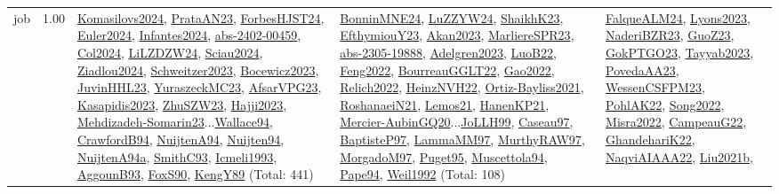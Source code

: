 {\begin{longtable}{p{3cm}r>{\raggedright\arraybackslash}p{6cm}>{\raggedright\arraybackslash}p{6cm}>{\raggedright\arraybackslash}p{8cm}}
\index{job}\index{Scheduling!job}job &  1.00 & \hyperref[detail:Komasilovs2024]{Komasilovs2024}, \hyperref[detail:PrataAN23]{PrataAN23}, \hyperref[detail:ForbesHJST24]{ForbesHJST24}, \hyperref[detail:Euler2024]{Euler2024}, \hyperref[detail:Infantes2024]{Infantes2024}, \hyperref[detail:abs-2402-00459]{abs-2402-00459}, \hyperref[detail:Col2024]{Col2024}, \hyperref[detail:LiLZDZW24]{LiLZDZW24}, \hyperref[detail:Sciau2024]{Sciau2024}, \hyperref[detail:Ziadlou2024]{Ziadlou2024}, \hyperref[detail:Schweitzer2023]{Schweitzer2023}, \hyperref[detail:Bocewicz2023]{Bocewicz2023}, \hyperref[detail:JuvinHHL23]{JuvinHHL23}, \hyperref[detail:YuraszeckMC23]{YuraszeckMC23}, \hyperref[detail:AfsarVPG23]{AfsarVPG23}, \hyperref[detail:Kasapidis2023]{Kasapidis2023}, \hyperref[detail:ZhuSZW23]{ZhuSZW23}, \hyperref[detail:Hajji2023]{Hajji2023}, \hyperref[detail:Mehdizadeh-Somarin23]{Mehdizadeh-Somarin23}...\hyperref[detail:Wallace94]{Wallace94}, \hyperref[detail:CrawfordB94]{CrawfordB94}, \hyperref[detail:NuijtenA94]{NuijtenA94}, \hyperref[detail:Nuijten94]{Nuijten94}, \hyperref[detail:NuijtenA94a]{NuijtenA94a}, \hyperref[detail:SmithC93]{SmithC93}, \hyperref[detail:Icmeli1993]{Icmeli1993}, \hyperref[detail:AggounB93]{AggounB93}, \hyperref[detail:FoxS90]{FoxS90}, \hyperref[detail:KengY89]{KengY89} (Total: 441) & \hyperref[detail:BonninMNE24]{BonninMNE24}, \hyperref[detail:LuZZYW24]{LuZZYW24}, \hyperref[detail:ShaikhK23]{ShaikhK23}, \hyperref[detail:EfthymiouY23]{EfthymiouY23}, \hyperref[detail:Akan2023]{Akan2023}, \hyperref[detail:MarliereSPR23]{MarliereSPR23}, \hyperref[detail:abs-2305-19888]{abs-2305-19888}, \hyperref[detail:Adelgren2023]{Adelgren2023}, \hyperref[detail:LuoB22]{LuoB22}, \hyperref[detail:Feng2022]{Feng2022}, \hyperref[detail:BourreauGGLT22]{BourreauGGLT22}, \hyperref[detail:Gao2022]{Gao2022}, \hyperref[detail:Relich2022]{Relich2022}, \hyperref[detail:HeinzNVH22]{HeinzNVH22}, \hyperref[detail:Ortiz-Bayliss2021]{Ortiz-Bayliss2021}, \hyperref[detail:RoshanaeiN21]{RoshanaeiN21}, \hyperref[detail:Lemos21]{Lemos21}, \hyperref[detail:HanenKP21]{HanenKP21}, \hyperref[detail:Mercier-AubinGQ20]{Mercier-AubinGQ20}...\hyperref[detail:JoLLH99]{JoLLH99}, \hyperref[detail:Caseau97]{Caseau97}, \hyperref[detail:BaptisteP97]{BaptisteP97}, \hyperref[detail:LammaMM97]{LammaMM97}, \hyperref[detail:MurthyRAW97]{MurthyRAW97}, \hyperref[detail:MorgadoM97]{MorgadoM97}, \hyperref[detail:Puget95]{Puget95}, \hyperref[detail:Muscettola94]{Muscettola94}, \hyperref[detail:Pape94]{Pape94}, \hyperref[detail:Weil1992]{Weil1992} (Total: 108) & \hyperref[detail:FalqueALM24]{FalqueALM24}, \hyperref[detail:Lyons2023]{Lyons2023}, \hyperref[detail:NaderiBZR23]{NaderiBZR23}, \hyperref[detail:GuoZ23]{GuoZ23}, \hyperref[detail:GokPTGO23]{GokPTGO23}, \hyperref[detail:Tayyab2023]{Tayyab2023}, \hyperref[detail:PovedaAA23]{PovedaAA23}, \hyperref[detail:WessenCSFPM23]{WessenCSFPM23}, \hyperref[detail:PohlAK22]{PohlAK22}, \hyperref[detail:Song2022]{Song2022}, \hyperref[detail:Misra2022]{Misra2022}, \hyperref[detail:CampeauG22]{CampeauG22}, \hyperref[detail:GhandehariK22]{GhandehariK22}, \hyperref[detail:NaqviAIAAA22]{NaqviAIAAA22}, \hyperref[detail:Liu2021b]{Liu2021b}, 
\end{longtable}}
